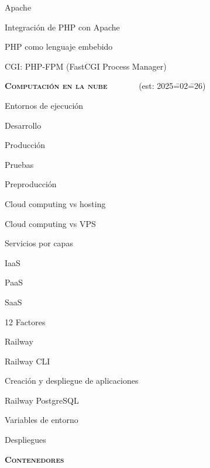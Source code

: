 \begin{longenum}
\begin{longenum}
        \item Apache \opcional\
        \begin{longenum}
            \item Integración de PHP con Apache
            \item PHP como lenguaje embebido
        \end{longenum}
        \item CGI: PHP-FPM (FastCGI Process Manager) \opcional\
    \end{longenum}
    \item \textbf{\textsc{Computación en la nube}} \ce{1d}\ \ \ \ \ \ \ (est: 2025\==02\==26)
    \begin{longenum}
        \item Entornos de ejecución
        \begin{longenum}
            \item Desarrollo
            \item Producción
            \item Pruebas
            \item Preproducción
        \end{longenum}
        \item Cloud computing vs hosting
        \item Cloud computing vs VPS
        \item Servicios por capas
        \begin{longenum}
            \item IaaS
            \item PaaS
            \item SaaS
        \end{longenum}
        \item 12 Factores
        \item Railway
        \begin{longenum}
            \item Railway CLI
            \item Creación y despliegue de aplicaciones
            \item Railway PostgreSQL
            \item Variables de entorno
            \item Despliegues
        \end{longenum}
    \end{longenum}
    \item \textbf{\textsc{Contenedores}} \ \ \ \ \ \opcional\ \

\end{longenum}
